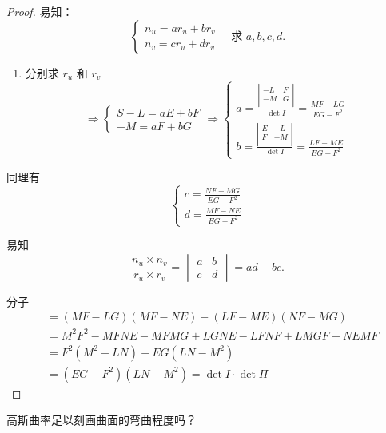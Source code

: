 \documentclass[lang=cn,10pt,thmcnt=section]{elegantbook}
\begin{document}
\begin{proof}
    易知：
\begin{equation}
    \begin{cases}
    n_u = a r_u + b r_v \\
    n_v = c r_u + d r_v
    \end{cases} \quad \text{求 } a, b, c, d.
\end{equation}

\begin{enumerate}
    \item 分别求 $r_u$ 和 $r_v$
    \begin{equation}
    \Rightarrow \begin{cases}
    S - L = aE + bF \\
    -M = aF + bG
    \end{cases}
    \Rightarrow \begin{cases}
    a = \frac{\left| \begin{matrix}
        -L&		F\\
        -M&		G\\
    \end{matrix} \right|}{\det  I} = \frac{MF - LG}{EG - F^2} \\
    b = \frac{\left| \begin{matrix}
        E&		-L\\
        F&		-M\\
    \end{matrix} \right|}{\det  I} = \frac{LF - ME}{EG - F^2}
    \end{cases}
    \end{equation}
\end{enumerate}

同理有
\begin{equation}
    \begin{cases}
    c = \frac{NF - MG}{EG - F^2} \\
    d = \frac{MF - NE}{EG - F^2}
    \end{cases}
\end{equation}

易知
\begin{equation}
    \frac{n_u \times n_v}{r_u \times r_v} = \begin{vmatrix} a & b \\ c & d \end{vmatrix} = ad - bc.
\end{equation}

分子
\begin{equation}
    \begin{aligned}
    &= (MF - LG)(MF - NE) - (LF - ME)(NF - MG) \\
    &= M^2F^2 - MFNE - MFMG + LGNE - LFNF + LMGF + NEMF \\
    &= F^2(M^2 - LN) + EG(LN - M^2) \\
    &= (EG - F^2)(LN - M^2) = \det I \cdot \det \Pi
    \end{aligned}
\end{equation}
\end{proof}
高斯曲率足以刻画曲面的弯曲程度吗？
\end{document}
